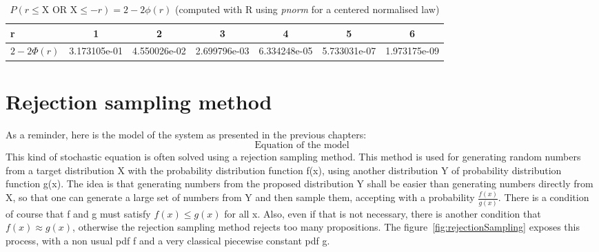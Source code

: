 	\begin{table}
		\centering
		\begin{tabular}{l||cccccc}
			\textbf{r}		& 1				& 2				& 3				& 4				& 5				& 6\\\hline
			$2-2\Phi(r)$	& 3.173105e-01	& 4.550026e-02	& 2.699796e-03	& 6.334248e-05	& 5.733031e-07	& 1.973175e-09
		\end{tabular}
		\caption{$P(r\leq\text{X OR X}\leq-r)=2-2\phi(r)$ (computed with R using \emph{pnorm} for a centered normalised law)}
		\label{tab:repartitionFunction}
	\end{table}

\section{Rejection sampling method}
	As a reminder, here is the model of the system as presented in the previous chapters:
	\begin{equation*}
		\text{Equation of the model}
	\end{equation*}
	This kind of stochastic equation is often solved using a rejection sampling method. This method is used for generating random numbers from a target distribution X with the probability distribution function f(x), using another distribution Y of probability distribution function g(x). The idea is that generating numbers from the proposed distribution Y shall be easier than generating numbers directly from X, so that one can generate a large set of numbers from Y and then sample them, accepting with a probability $\frac{f(x)}{g(x)}$. There is a condition of course that f and g must satisfy $f(x)\leq g(x)$ for all x. Also, even if that is not necessary, there is another condition that $f(x)\approx g(x)$, otherwise the rejection sampling method rejects too many propositions. The figure~\ref{fig:rejectionSampling} exposes this process, with a non usual pdf f and a very classical piecewise constant pdf g.
